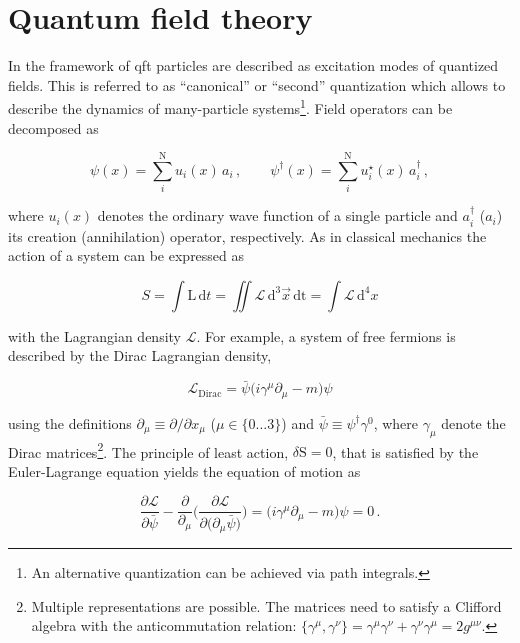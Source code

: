\section{Quantum field theory}

In the framework of \gls{qft} particles are described as excitation modes of quantized fields. This is referred to as ``canonical'' or ``second'' quantization which allows to describe the dynamics of many-particle systems\footnote{An alternative quantization can be achieved via path integrals.}. Field operators can be decomposed as

\begin{equation}
\psi(x)=\sum_{i}^{\mathrm{N}}u_{i}(x)\,a_{i}\,,\qquad\psi^{\dagger}(x)=\sum_{i}^{\mathrm{N}}u^{\star}_{i}(x)\,a^{\dagger}_{i}\,,
\end{equation}

where $u_{i}(x)$ denotes the ordinary wave function of a single particle and $a^{\dagger}_{i}$ ($a_{i}$) its creation (annihilation) operator, respectively. As in classical mechanics the action of a system can be expressed as

\begin{equation}
S=\int\mathrm{L}\,\mathrm{d}t=\iint\mathcal{L}\,\mathrm{d}^{3}\vec{x}\,\mathrm{dt}=\int\mathcal{L}\,\mathrm{d}^{4}x
\end{equation}

with the Lagrangian density $\mathcal{L}$. For example, a system of free fermions is described by the Dirac Lagrangian density,

\begin{equation}
\label{eq:theory-diracL}
\mathcal{L}_\mathrm{Dirac}=\bar{\psi}\big(i\gamma^\mu\partial_\mu-m\big)\psi
\end{equation}

using the definitions $\partial_\mu\equiv\partial/\partial x_\mu$ ($\mu\in\{0\ldots3\}$) and $\bar{\psi}\equiv\psi^\dagger\gamma^{0}$, where $\gamma_\mu$ denote the Dirac matrices\footnote{Multiple representations are possible. The matrices need to satisfy a Clifford algebra with the anticommutation relation: $\big\{\gamma^\mu,\gamma^\nu\big\}=\gamma^\mu\gamma^\nu+\gamma^\nu\gamma^\mu=2g^{\mu\nu}$.}. The principle of least action, $\delta \mathrm{S}=0$, that is satisfied by the Euler-Lagrange equation yields the equation of motion as

\begin{equation}
\frac{\partial\mathcal{L}}{\partial\bar{\psi}}-\frac{\partial}{\partial_\mu}\Bigg(\frac{\partial\mathcal{L}}{\partial\big(\partial_\mu\bar{\psi}\big)}\Bigg)=\big(i\gamma^\mu\partial_\mu-m\big)\psi=0\,.
\end{equation}

